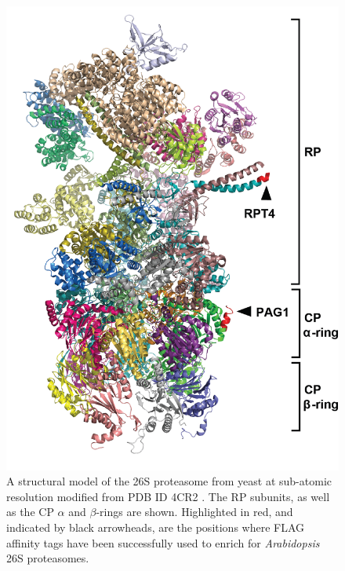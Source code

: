 \begin{figure}[p]
	\centering
	\includegraphics[width=\columnwidth]{intro/taglocations.png}
	{A structural model of the 26S proteasome from yeast at sub-atomic resolution modified from PDB ID 4CR2 \citep{beck12}.  The RP subunits, as well as the CP $\alpha$ and $\beta$-rings are shown.  Highlighted in red, and indicated by black arrowheads, are the positions where FLAG affinity tags have been successfully used to enrich for \textit{Arabidopsis} 26S proteasomes.}
	\label{fig:taglocations}
\end{figure}


\FloatBarrier
\begin{singlespace}

\renewcommand\bibname{Literature Cited}

\end{singlespace}
